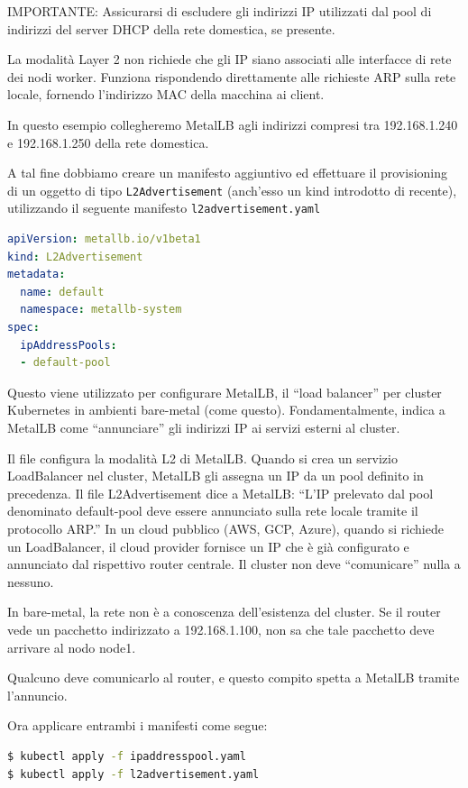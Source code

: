 \documentclass[11pt, a4paper]{article}
\begin{document}
IMPORTANTE: Assicurarsi di escludere gli indirizzi IP utilizzati dal pool di indirizzi del server DHCP della rete domestica, se presente.

La modalità Layer 2 non richiede che gli IP siano associati alle interfacce di rete dei nodi worker. Funziona rispondendo direttamente alle richieste ARP sulla rete locale, fornendo l'indirizzo MAC della macchina ai client.

In questo esempio collegheremo MetalLB agli indirizzi compresi tra 192.168.1.240 e 192.168.1.250 della rete domestica.

A tal fine dobbiamo creare un manifesto aggiuntivo ed effettuare il provisioning di un oggetto di tipo \texttt{L2Advertisement} (anch'esso un kind introdotto di recente), utilizzando il seguente manifesto \texttt{l2advertisement.yaml}

\begin{lstlisting}[language=yaml]
apiVersion: metallb.io/v1beta1
kind: L2Advertisement
metadata:
  name: default
  namespace: metallb-system
spec:
  ipAddressPools:
  - default-pool
\end{lstlisting}

Questo viene utilizzato per configurare MetalLB, il ``load balancer'' per cluster Kubernetes in ambienti bare-metal (come questo). Fondamentalmente, indica a MetalLB come ``annunciare'' gli indirizzi IP ai servizi esterni al cluster.

Il file configura la modalità L2 di MetalLB. Quando si crea un servizio LoadBalancer nel cluster, MetalLB gli assegna un IP da un pool definito in precedenza. Il file L2Advertisement dice a MetalLB: ``L'IP prelevato dal pool denominato default-pool deve essere annunciato sulla rete locale tramite il protocollo ARP.'' In un cloud pubblico (AWS, GCP, Azure), quando si richiede un LoadBalancer, il cloud provider fornisce un IP che è già configurato e annunciato dal rispettivo router centrale. Il cluster non deve ``comunicare'' nulla a nessuno.

In bare-metal, la rete non è a conoscenza dell'esistenza del cluster. Se il router vede un pacchetto indirizzato a 192.168.1.100, non sa che tale pacchetto deve arrivare al nodo node1.

Qualcuno deve comunicarlo al router, e questo compito spetta a MetalLB tramite l'annuncio.

Ora applicare entrambi i manifesti come segue:

\begin{lstlisting}[language=bash]
$ kubectl apply -f ipaddresspool.yaml
$ kubectl apply -f l2advertisement.yaml
\end{lstlisting}
\end{document}
